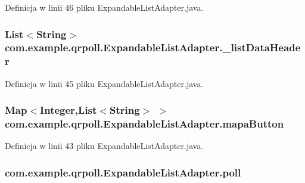 Definicja w linii 46 pliku Expandable\+List\+Adapter.\+java.

\hypertarget{classcom_1_1example_1_1qrpoll_1_1_expandable_list_adapter_a7290d1e184f1a8ef03ad8ea5bd4f273d}{
\subsubsection[{\+\_\+list\+Data\+Header}]{\setlength{\rightskip}{0pt plus 5cm}List$<$String$>$ com.\+example.\+qrpoll.\+Expandable\+List\+Adapter.\+\_\+list\+Data\+Header\hspace{0.3cm}{\ttfamily [private]}}}\label{classcom_1_1example_1_1qrpoll_1_1_expandable_list_adapter_a7290d1e184f1a8ef03ad8ea5bd4f273d}


Definicja w linii 45 pliku Expandable\+List\+Adapter.\+java.

\hypertarget{classcom_1_1example_1_1qrpoll_1_1_expandable_list_adapter_a8351d33fae079b02fb540090d49c6f2e}{
\subsubsection[{mapa\+Button}]{\setlength{\rightskip}{0pt plus 5cm}Map$<$Integer,List$<$String$>$ $>$ com.\+example.\+qrpoll.\+Expandable\+List\+Adapter.\+mapa\+Button\hspace{0.3cm}{\ttfamily [private]}}}\label{classcom_1_1example_1_1qrpoll_1_1_expandable_list_adapter_a8351d33fae079b02fb540090d49c6f2e}


Definicja w linii 43 pliku Expandable\+List\+Adapter.\+java.

\hypertarget{classcom_1_1example_1_1qrpoll_1_1_expandable_list_adapter_a35f2a91149fc7265646cd916c54a02ef}{
\subsubsection[{poll}]{ com.\+example.\+qrpoll.\+Expandable\+List\+Adapter.\+poll\hspace{0.3cm}{\ttfamily [private]}}}\label{classcom_1_1example_1_1qrpoll_1_1_expandable_list_adapter_a35f2a91149fc7265646cd916c54a02ef}


